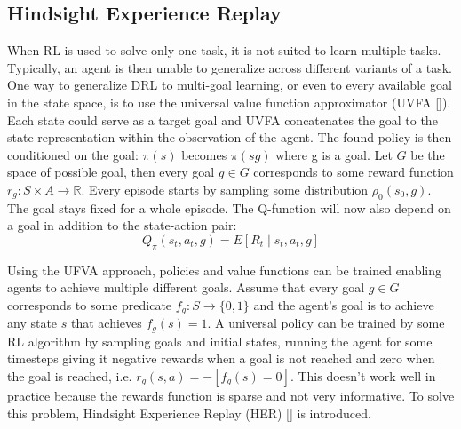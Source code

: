 \documentclass[conference]{IEEEtran}
\begin{document}
\subsection{Hindsight Experience Replay} \label{subsec:her}
When RL is used to solve only one task, it is not suited to learn multiple tasks. Typically, an agent is then unable to generalize across different variants of a task. One way to generalize DRL to multi-goal learning, or even to every available goal in the state space, is to use the universal value function approximator (UVFA [\cite{schaul2015universal}]). Each state could serve as a target goal and UVFA concatenates the goal to the state representation within the observation of the agent. The found policy is then conditioned on the goal: $\pi(s)$ becomes $\pi(s g)$ where g is a goal. Let $G$ be the space of possible goal, then every goal $g \in G$ corresponds to some reward function $r_g: S \times A \to \mathbb{R}$. Every episode starts by sampling some distribution $\rho_0(s_0, g)$. The goal stays fixed for a whole episode. The Q-function will now also depend on a goal in addition to the state-action pair:
\begin{equation*}
    Q_{\pi}(s_t, a_t, g) = E \left[R_t \mid s_t,a_t, g \right]
\end{equation*}

Using the UFVA approach, policies and value functions can be trained enabling agents to achieve multiple different goals. Assume that every goal $g \in G$ corresponds to some predicate $f_g : S \to \{0, 1\}$ and the agent's goal is to achieve any state $s$ that achieves $f_g(s) = 1$. A universal policy can be trained by some RL algorithm by sampling goals and initial states, running the agent for some timesteps giving it negative rewards when a goal is not reached and zero when the goal is reached, i.e. $r_g(s, a) = -[f_g(s) = 0]$. This doesn't work well in practice because the rewards function is sparse and not very informative. To solve this problem, Hindsight Experience Replay (HER) [\cite{andrychowicz2017hindsight}] is introduced.
\end{document}
